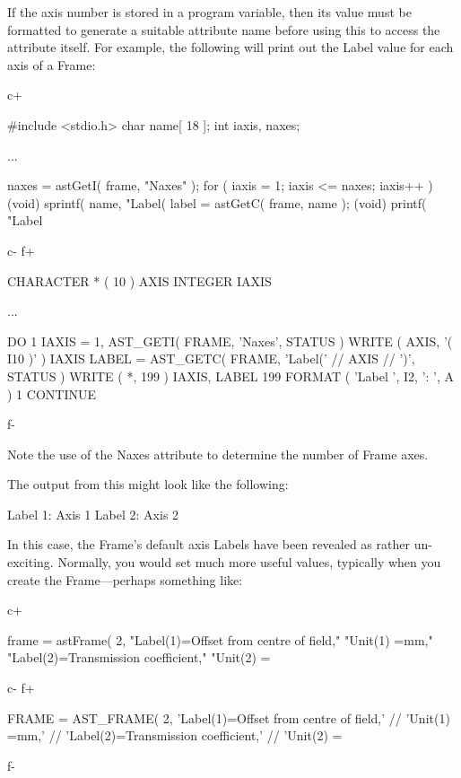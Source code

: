 \documentclass[twoside,11pt]{starlink}
\begin{document}
If the axis number is stored in a program variable, then its value
must be formatted to generate a suitable attribute name before using
this to access the attribute itself. For example, the following will
print out the Label value for each axis of a Frame:

c+
\small
\begin{terminalv}
#include <stdio.h>
char name[ 18 ];
int iaxis, naxes;

...

naxes = astGetI( frame, "Naxes" );
for ( iaxis = 1; iaxis <= naxes; iaxis++ ) {
   (void) sprintf( name, "Label(%
   label = astGetC( frame, name );
   (void) printf( "Label %
}
\end{terminalv}
\normalsize
c-
f+
\small
\begin{terminalv}
      CHARACTER * ( 10 ) AXIS
      INTEGER IAXIS

      ...

      DO 1 IAXIS = 1, AST_GETI( FRAME, 'Naxes', STATUS )
         WRITE ( AXIS, '( I10 )' ) IAXIS
         LABEL = AST_GETC( FRAME, 'Label(' // AXIS // ')', STATUS )
         WRITE ( *, 199 ) IAXIS, LABEL
 199     FORMAT ( 'Label ', I2, ': ', A )
 1    CONTINUE
\end{terminalv}
\normalsize
f-

Note the use of the Naxes attribute to determine the number of Frame
axes.

The output from this might look like the following:

\begin{terminalv}
Label  1: Axis 1
Label  2: Axis 2
\end{terminalv}

In this case, the Frame's default axis Labels have been revealed as
rather un-exciting. Normally, you would set much more useful values,
typically when you create the Frame---perhaps something like:

c+
\small
\begin{terminalv}
frame = astFrame( 2, "Label(1)=Offset from centre of field,"
                     "Unit(1) =mm,"
                     "Label(2)=Transmission coefficient,"
                     "Unit(2) =%
\end{terminalv}
\normalsize
c-
f+
\small
\begin{terminalv}
      FRAME = AST_FRAME( 2, 'Label(1)=Offset from centre of field,' //
                            'Unit(1) =mm,' //
                            'Label(2)=Transmission coefficient,' //
                            'Unit(2) =%
\end{terminalv}
\normalsize
f-
\end{document}
